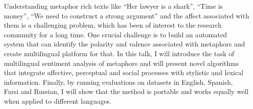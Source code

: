 Understanding metaphor rich texts like ``Her lawyer is a shark'', ``Time is money'', ``We need to construct a strong argument'' and the affect associated with them is a challenging problem, which has been of interest to the research community for a long time. One crucial challenge is to build an automated system that can identify the polarity and valence associated with metaphors and create multilingual platform for that. In this talk, I will introduce the task of multilingual sentiment analysis of metaphors and will present novel algorithms that integrate affective, perceptual and social processes with stylistic and lexical information. Finally, by running evaluations on datasets in English, Spanish, Farsi and Russian, I will show that the method is portable and works equally well when applied to different languages.
